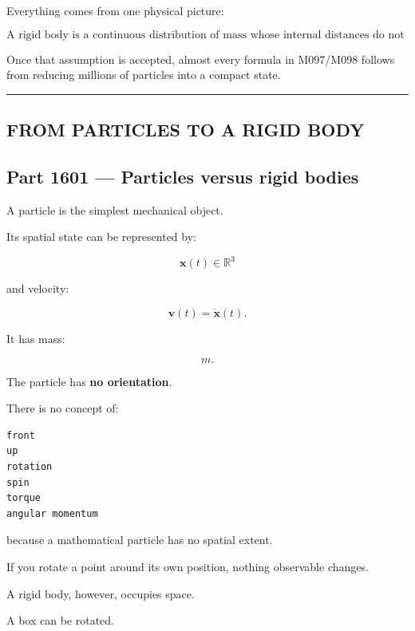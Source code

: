 Everything comes from one physical picture:

\[
\boxed{
\text{A rigid body is a continuous distribution of mass whose internal distances do not change.}
}
\]

Once that assumption is accepted, almost every formula in M097/M098 follows from reducing millions of particles into a compact state.

\begin{center}\rule{0.5\linewidth}{0.5pt}\end{center}

\subsection{FROM PARTICLES TO A RIGID BODY}\label{06-engine-ii-ch034-from-particles-to-a-rigid-body}

\hypertarget{06-engine-ii-ch034-from-particles-to-a-rigid-body}{}

\subsection{Part 1601 --- Particles versus rigid bodies}\label{06-engine-ii-ch034-part-1601-particles-versus-rigid-bodies}

\hypertarget{06-engine-ii-ch034-part-1601-particles-versus-rigid-bodies}{}

A particle is the simplest mechanical object.

Its spatial state can be represented by:

\[
\mathbf{x}(t)\in\mathbb{R}^3
\]

and velocity:

\[
\mathbf{v}(t)=\dot{\mathbf{x}}(t).
\]

It has mass:

\[
m.
\]

The particle has \textbf{no orientation}.

There is no concept of:

\begin{verbatim}
front
up
rotation
spin
torque
angular momentum
\end{verbatim}

because a mathematical particle has no spatial extent.

If you rotate a point around its own position, nothing observable changes.

A rigid body, however, occupies space.

A box can be rotated.


